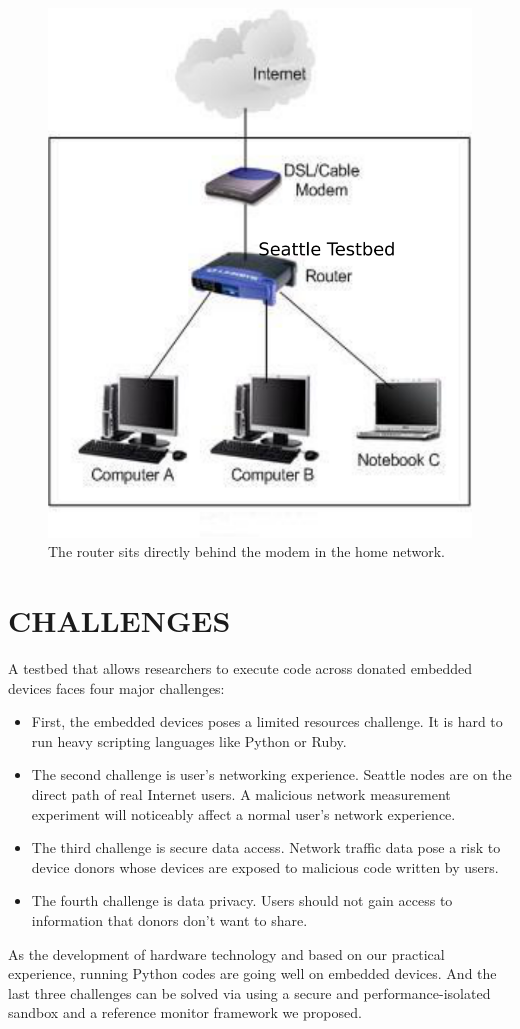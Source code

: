 \documentclass[conference]{IEEEtran}   	%
\begin{document}
\begin{figure}%
\centering
\includegraphics[width=0.5\columnwidth]{home-network.jpg}
\caption{The router sits directly behind the modem in the home network.}
\label{figure:design}
\end{figure}

\section{CHALLENGES}
\label{sec.challenges}
A testbed that allows researchers to execute code across donated embedded devices faces four major challenges: 
\begin{itemize}
\item First, the embedded devices poses a limited resources challenge. It is hard to run heavy scripting languages like Python or Ruby. 
\item The second challenge is user's networking experience. Seattle nodes are on the direct path of real Internet users. A malicious network measurement experiment will noticeably affect a normal user's network experience. 
\item The third challenge is secure data access. Network traffic data pose a risk to device donors whose devices are exposed to malicious code written by users. 
\item The fourth challenge is data privacy. Users should not gain access to information that donors don't want to share.
\end{itemize}
As the development of hardware technology and based on our practical experience, running Python codes are going well on embedded devices. And the last three challenges can be solved via using a secure and performance-isolated sandbox and a reference monitor framework we proposed.
\end{document}
